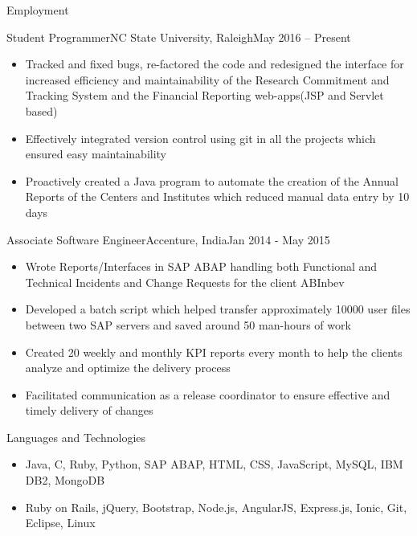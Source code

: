 \documentclass[]{mcdowellcv}
\begin{document}
	\begin{cvsection}{Employment}
		\begin{cvsubsection}{Student Programmer}{NC State University, Raleigh}{May 2016 – Present}
			\begin{itemize}
            \item Tracked and fixed bugs, re-factored the code and redesigned the interface for increased efficiency and maintainability of the Research Commitment and Tracking System and the Financial Reporting web-apps(JSP and Servlet based)
            \item Effectively integrated version control using git in all the projects which ensured easy maintainability
			\item Proactively created a Java program to automate the creation of the Annual Reports of the Centers and Institutes which reduced manual data entry by 10 days
			\end{itemize}
		\end{cvsubsection}
		
		\begin{cvsubsection}{Associate Software Engineer}{Accenture, India}{Jan 2014 - May 2015}	
			\begin{itemize}
            	\item Wrote Reports/Interfaces in SAP ABAP handling both Functional and Technical Incidents and Change Requests for the client ABInbev
				\item Developed a batch script which helped transfer approximately 10000 user files between two SAP servers and saved around 50 man-hours  of work
				\item Created 20 weekly and monthly KPI reports every month to help the clients analyze and optimize the delivery process
                \item Facilitated communication as a release coordinator to ensure effective and timely delivery of changes
			\end{itemize}
		\end{cvsubsection}

	\end{cvsection}

\begin{cvsection}{Languages and Technologies}
		\begin{cvsubsection}{}{}{}	
			\begin{itemize}
				\item Java, C, Ruby, Python, SAP ABAP, HTML, CSS, JavaScript, MySQL, IBM DB2, MongoDB
				\item Ruby on Rails, jQuery, Bootstrap, Node.js, AngularJS, Express.js, Ionic, Git, Eclipse, Linux
			\end{itemize}
		\end{cvsubsection}
	\end{cvsection}
	
\end{document}
